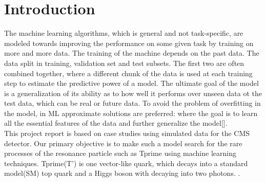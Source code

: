 \chapter{\label{intro}Introduction}

The machine learning algorithms, which is general and not task-specific, are modeled towards improving the  performance on some given task by training on more and more data\cite{1-5}. The training of the machine depends on the past data. The data split in training, validation set and test subsets. The first two are often combined together, where a different chunk of the data is used at each training step to estimate the predictive power of a model. The ultimate goal of the model is a generalization of its ability as to how well it performs over unseen data ot the test data,  which can be real or future data. To avoid the problem of overfitting in the model, in ML approximate solutions are preferred: where the goal is to learn all the essential features of the data and further generalize the model[\cite{4}]. \\


This project report is based on case studies using simulated data for the CMS detector. Our primary objective is to make such a model search for the rare processes of the resonance particle such as Tprime using machine learning techniques. Tprime(T') is one vector-like quark, which decays into a standard model(SM) top quark and a Higgs boson with decaying into two photons.  \cite{12}.



